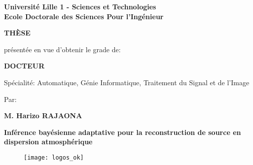 \thispagestyle{empty}


{\large

\begin{center}

{\bf Université Lille 1 - Sciences et Technologies\\ 
	Ecole Doctorale des Sciences Pour l'Ingénieur} 

\vspace*{0.4cm}

{\large {\bf TH\`ESE}}

\vspace*{0.25cm}

présentée en vue d'obtenir le grade de:

\vspace*{0.25cm}

{\large {\bf DOCTEUR}}

\vspace*{0.25cm}

Spécialité: Automatique, Génie Informatique, Traitement du Signal et de l'Image

\vspace*{0.4cm}

Par:

\vspace*{0.25cm}

{\Large {\bf M. Harizo RAJAONA}}

\vspace*{1.5cm}



{\huge {\bf Inférence bayésienne adaptative pour la reconstruction de source en dispersion atmosphérique }}

\end{center}


}

\begin{figure}[h!]
	\centering
	\texttt{[image: logos\_ok]}
\end{figure}

